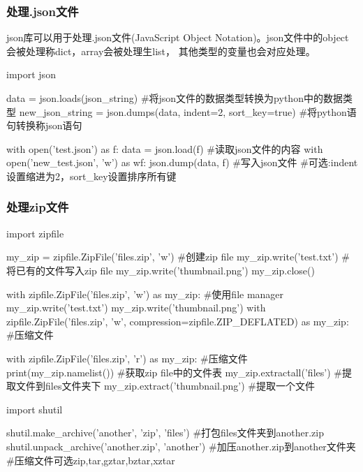     \subsubsection{处理.json文件}
      json库可以用于处理.json文件(JavaScript Object Notation)。json文件中的object会被处理称dict，array会被处理生list，
      其他类型的变量也会对应处理。
      \begin{codeblock}[language=python, caption={json module}]
        import json

        data = json.loads(json_string) #将json文件的数据类型转换为python中的数据类型
        new_json_string = json.dumps(data, indent=2, sort_key=true) 
            #将python语句转换称json语句

        with open('test.json') as f:
            data = json.load(f) #读取json文件的内容
        with open('new_test.json', 'w') as wf:
            json.dump(data, f) #写入json文件
        #可选:indent设置缩进为2，sort\_key设置排序所有键
      \end{codeblock}

    \subsubsection{处理zip文件}
      \begin{codeblock}[language=python, caption={zip file}]
        import zipfile
        
        my_zip = zipfile.ZipFile('files.zip', 'w') #创建zip file
        my_zip.write('test.txt') #将已有的文件写入zip file
        my_zip.write('thumbnail.png')
        my_zip.close()

        with zipfile.ZipFile('files.zip', 'w') as my_zip: #使用file manager
            my_zip.write('test.txt')
            my_zip.write('thumbnail.png')
        with zipfile.ZipFile('files.zip', 'w', compression=zipfile.ZIP_DEFLATED) as my_zip: 
            #压缩文件

        with zipfile.ZipFile('files.zip', 'r') as my_zip: #压缩文件
            print(my_zip.namelist()) #获取zip file中的文件表
            my_zip.extractall('files') #提取文件到files文件夹下
            my_zip.extract('thumbnail.png') #提取一个文件

        import shutil

        shutil.make_archive('another', 'zip', 'files') #打包files文件夹到another.zip
        shutil.unpack_archive('another.zip', 'another') #加压another.zip到another文件夹
        #压缩文件可选zip,tar,gztar,bztar,xztar
      \end{codeblock}
